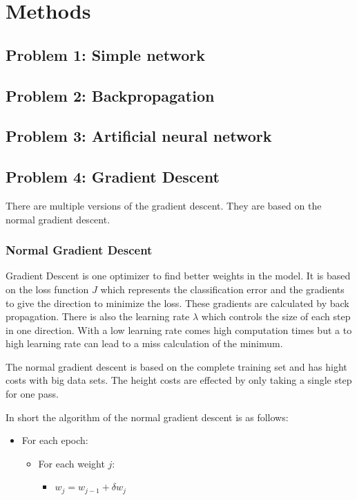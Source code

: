 \chapter{Methods}
\section{Problem 1: Simple network}
\section{Problem 2: Backpropagation}
\section{Problem 3: Artificial neural network}
\section{Problem 4: Gradient Descent}

There are multiple versions of the gradient descent.
They are based on the normal gradient descent.

\subsection{Normal Gradient Descent}

Gradient Descent is one optimizer to find better weights in the model.
It is based on the loss function $J$ which represents the classification error and the gradients to give the direction to minimize the loss.
These gradients are calculated by back propagation.
There is also the learning rate $\lambda$ which controls the size of each step in one direction.
With a low learning rate comes high computation times but a to high learning rate can lead to a miss calculation of the minimum.

The normal gradient descent is based on the complete training set and has hight costs with big data sets.
The height costs are effected by only taking a single step for one pass.

In short the algorithm of the normal gradient descent is as follows:

\begin{itemize}
	\item For each epoch:
	\begin{itemize}
		\item For each weight $j$:
		\begin{itemize}
            \item $w_j = w_{j-1} + \delta{w_j}$
		\end{itemize}
	\end{itemize}
\end{itemize}


